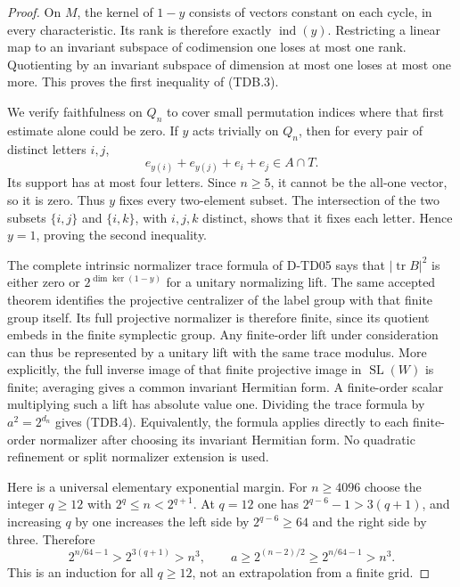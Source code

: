 \begin{proof}
On $M$, the kernel of $1-y$ consists of vectors constant on each
cycle, in every characteristic. Its rank is therefore exactly
$\operatorname{ind}(y)$. Restricting a linear map to an invariant
subspace of codimension one loses at most one rank. Quotienting
by an invariant subspace of dimension at most one loses at most
one more. This proves the first inequality of (TDB.3).

We verify faithfulness on $Q_n$ to cover small permutation indices
where that first estimate alone could be zero. If $y$ acts trivially
on $Q_n$, then for every pair of distinct letters $i,j$,
\[
 e_{y(i)}+e_{y(j)}+e_i+e_j\in A\cap T.
 \tag{TDB.6}
\]
Its support has at most four letters. Since $n\ge5$, it cannot
be the all-one vector, so it is zero. Thus $y$ fixes every
two-element subset. The intersection of the two subsets
$\{i,j\}$ and $\{i,k\}$, with $i,j,k$ distinct, shows that it
fixes each letter. Hence $y=1$, proving the second inequality.

The complete intrinsic normalizer trace formula of D-TD05 says
that $|\operatorname{tr}B|^2$ is either zero or
$2^{\dim\ker(1-y)}$ for a unitary normalizing lift.
The same accepted theorem identifies the projective centralizer
of the label group with that finite group itself. Its full projective
normalizer is therefore finite, since its quotient embeds in the
finite symplectic group. Any finite-order lift under consideration
can thus be represented by a unitary lift with the same trace modulus.
More explicitly, the
full inverse image of that finite projective image in
$\operatorname{SL}(W)$ is finite; averaging gives a common invariant
Hermitian form. A finite-order scalar multiplying such a lift has
absolute value one. Dividing the trace formula by $a^2=2^{d_n}$
gives (TDB.4). Equivalently, the formula applies directly to each
finite-order normalizer after choosing its invariant Hermitian form.
No quadratic refinement or split normalizer extension is used.

Here is a universal elementary exponential margin. For $n\ge4096$
choose the integer $q\ge12$ with $2^q\le n<2^{q+1}$.
At $q=12$ one has $2^{q-6}-1>3(q+1)$, and increasing $q$ by one
increases the left side by $2^{q-6}\ge64$ and the right side by
three. Therefore
\[
 2^{n/64-1}>2^{3(q+1)}>n^3,
 \qquad
 a\ge2^{(n-2)/2}\ge2^{n/64-1}>n^3.
 \tag{TDB.7}
\]
This is an induction for all $q\ge12$, not an extrapolation
from a finite grid.


\end{proof}
